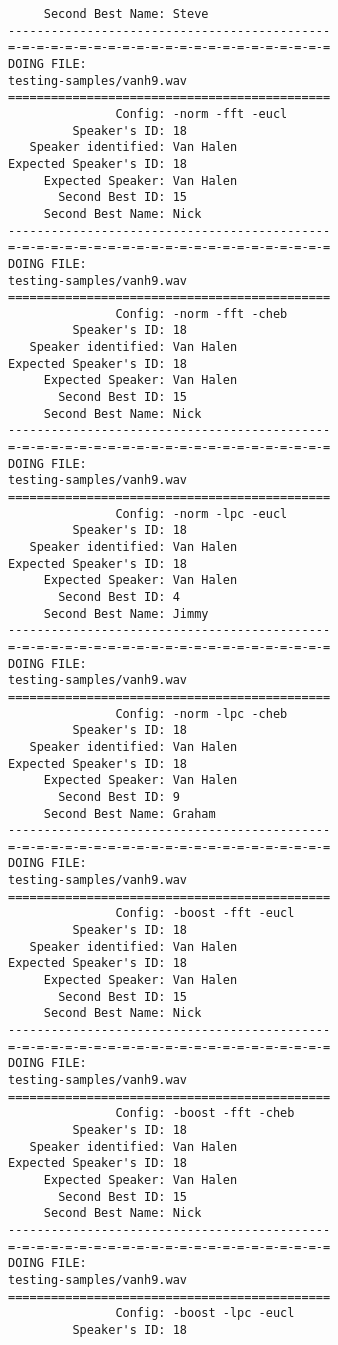 \begin{verbatim}
     Second Best Name: Steve
---------------------------------------------
=-=-=-=-=-=-=-=-=-=-=-=-=-=-=-=-=-=-=-=-=-=-=
DOING FILE:
testing-samples/vanh9.wav
=============================================
               Config: -norm -fft -eucl
         Speaker's ID: 18
   Speaker identified: Van Halen
Expected Speaker's ID: 18
     Expected Speaker: Van Halen
       Second Best ID: 15
     Second Best Name: Nick
---------------------------------------------
=-=-=-=-=-=-=-=-=-=-=-=-=-=-=-=-=-=-=-=-=-=-=
DOING FILE:
testing-samples/vanh9.wav
=============================================
               Config: -norm -fft -cheb
         Speaker's ID: 18
   Speaker identified: Van Halen
Expected Speaker's ID: 18
     Expected Speaker: Van Halen
       Second Best ID: 15
     Second Best Name: Nick
---------------------------------------------
=-=-=-=-=-=-=-=-=-=-=-=-=-=-=-=-=-=-=-=-=-=-=
DOING FILE:
testing-samples/vanh9.wav
=============================================
               Config: -norm -lpc -eucl
         Speaker's ID: 18
   Speaker identified: Van Halen
Expected Speaker's ID: 18
     Expected Speaker: Van Halen
       Second Best ID: 4
     Second Best Name: Jimmy
---------------------------------------------
=-=-=-=-=-=-=-=-=-=-=-=-=-=-=-=-=-=-=-=-=-=-=
DOING FILE:
testing-samples/vanh9.wav
=============================================
               Config: -norm -lpc -cheb
         Speaker's ID: 18
   Speaker identified: Van Halen
Expected Speaker's ID: 18
     Expected Speaker: Van Halen
       Second Best ID: 9
     Second Best Name: Graham
---------------------------------------------
=-=-=-=-=-=-=-=-=-=-=-=-=-=-=-=-=-=-=-=-=-=-=
DOING FILE:
testing-samples/vanh9.wav
=============================================
               Config: -boost -fft -eucl
         Speaker's ID: 18
   Speaker identified: Van Halen
Expected Speaker's ID: 18
     Expected Speaker: Van Halen
       Second Best ID: 15
     Second Best Name: Nick
---------------------------------------------
=-=-=-=-=-=-=-=-=-=-=-=-=-=-=-=-=-=-=-=-=-=-=
DOING FILE:
testing-samples/vanh9.wav
=============================================
               Config: -boost -fft -cheb
         Speaker's ID: 18
   Speaker identified: Van Halen
Expected Speaker's ID: 18
     Expected Speaker: Van Halen
       Second Best ID: 15
     Second Best Name: Nick
---------------------------------------------
=-=-=-=-=-=-=-=-=-=-=-=-=-=-=-=-=-=-=-=-=-=-=
DOING FILE:
testing-samples/vanh9.wav
=============================================
               Config: -boost -lpc -eucl
         Speaker's ID: 18

\end{verbatim}
